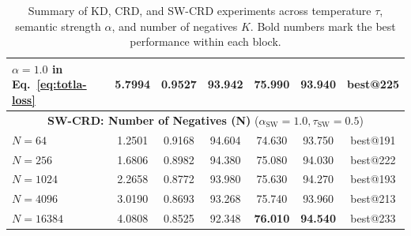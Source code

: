 \documentclass{article}
\theoremstyle{plain}
\theoremstyle{remark}
\begin{document}
\begin{table}[h]
\begin{tabular}{lcccccc}
\midrule
$\alpha=1.0$ in Eq.~\eqref{eq:totla-loss} & 5.7994 & 0.9527 & 93.942 & 75.990 & 93.940 & best@225 \\
\midrule
\multicolumn{7}{c}{\textbf{SW-CRD: Number of Negatives (N)} ($\alpha_{\text{SW}}=1.0, \tau_{\text{SW}}=0.5$)} \\
\midrule
$N=64$ & 1.2501 & 0.9168 & 94.604 & 74.630 & 93.750 & best@191 \\
$N=256$ & 1.6806 & 0.8982 & 94.380 & 75.080 & 94.030 & best@222 \\
$N=1024$ & 2.2658 & 0.8772 & 93.980 & 75.630 & 94.270 & best@193 \\
$N=4096$ & 3.0190 & 0.8693 & 93.268 & 75.740 & 93.960 & best@213 \\
$N=16384$ & 4.0808 & 0.8525 & 92.348 & \textbf{76.010} & \textbf{94.540} & best@233 \\
\bottomrule
\end{tabular}
\caption{Summary of KD, CRD, and SW-CRD experiments across temperature $\tau$, semantic strength $\alpha$, and number of negatives $K$. Bold numbers mark the best performance within each block.}
\label{tab:all_experiments}
\end{table}
\end{document}
